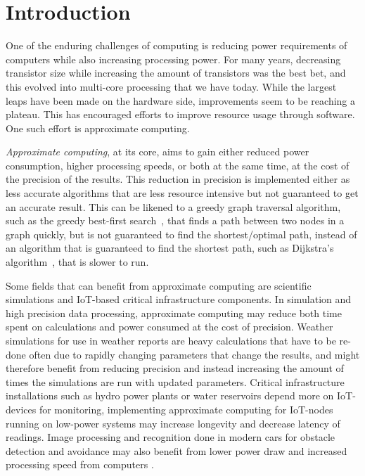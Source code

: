 \section{Introduction}

One of the enduring challenges of computing is reducing power requirements of computers while also increasing processing power. For many years, decreasing transistor size while increasing the amount of transistors was the best bet, and this evolved into multi-core processing that we have today. While the largest leaps have been made on the hardware side, improvements seem to be reaching a plateau. This has encouraged efforts to improve resource usage through software. One such effort is approximate computing. 

\emph{Approximate computing}, at its core, aims to gain either reduced power consumption, higher processing speeds, or both at the same time, at the cost of the precision of the results. This reduction in precision is implemented either as less accurate algorithms that are less resource intensive but not guaranteed to get an accurate result. This can be likened to a greedy graph traversal algorithm, such as the greedy best-first search~\citep{coles2007marvin}, that finds a path between two nodes in a graph quickly, but is not guaranteed to find the shortest/optimal path, instead of an algorithm that is guaranteed to find the shortest path, such as Dijkstra's algorithm~\citep{dijkstra1959note}, that is slower to run.

Some fields that can benefit from approximate computing are scientific simulations and IoT-based critical infrastructure components. In simulation and high precision data processing, approximate computing may reduce both time spent on calculations and power consumed at the cost of precision. Weather simulations for use in weather reports are heavy calculations that have to be re-done often due to rapidly changing parameters that change the results, and might therefore benefit from reducing precision and instead increasing the amount of times the simulations are run with updated parameters. Critical infrastructure installations such as hydro power plants or water reservoirs depend more on IoT-devices for monitoring, implementing approximate computing for IoT-nodes running on low-power systems may increase longevity and decrease latency of readings. Image processing and recognition done in modern cars for obstacle detection and avoidance may also benefit from lower power draw and increased processing speed from computers .

